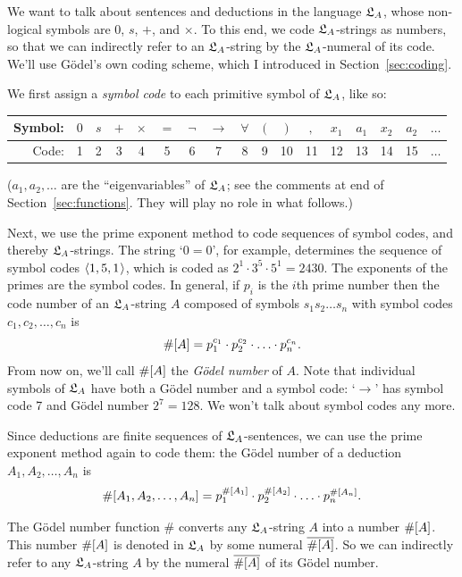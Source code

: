 We want to talk about sentences and deductions in the language $\mathfrak{L}_A$,
whose non-logical symbols are $0$, $s$, $+$, and $\times$.
To this end,
we code $\mathfrak{L}_A$-strings as numbers,
so that we can indirectly refer to an $\mathfrak{L}_A$-string by the $\mathfrak{L}_A$-numeral of its code.
We'll use Gödel's own coding scheme,
which I introduced in Section~\ref{sec:coding}.

We first assign a \emph{symbol code} to each primitive symbol of $\mathfrak{L}_A$,
like so:

\smallskip
\begin{center}
\begin{tabular}{rcccccccccccccccc}
\toprule
Symbol: & $0$ & $s$ & $+$ & $\times$ & $=$ & $\neg$ & $\to$ & $\forall$ & $($ & $)$ & $,$ & $x_{1}$ & $a_{1}$ & $x_2$ & $a_2$ & $\ldots$ \\
\midrule
Code: & 1 & 2 & 3 & 4 & 5 & 6 & 7 & 8 & 9 & 10 & 11 & 12 & 13 & 14 & 15 & $\ldots$ \\
\bottomrule
\end{tabular}
\end{center}
\smallskip

\noindent%
($a_1, a_2, \ldots$ are the ``eigenvariables'' of $\mathfrak{L}_A$;
see the comments at end of Section~\ref{sec:functions}.
They will play no role in what follows.)

Next, we use the prime exponent method to code sequences of symbol codes,
and thereby $\mathfrak{L}_A$-strings.
The string `$0 = 0$',
for example,
determines the sequence of symbol codes $\t{1, 5, 1}$,
which is coded as $2^{1} \cdot 3^{5} \cdot 5^{1} = 2430$.
The exponents of the primes are the symbol codes.
In general,
if $p_i$ is the $i$th prime number then
the code number of an $\mathfrak{L}_A$-string $A$ composed
of symbols $s_1s_2\ldots s_n$ with symbol codes $c_1, c_2, \ldots, c_n$ is
\[
    \#[A] = p_1^{c_1} \cdot p_2^{c_2} \cdot \ldots  \cdot p_n^{c_n}.
\]
From now on,
we'll call $\#[A]$ the \emph{Gödel number} of $A$.
Note that
individual symbols of $\mathfrak{L}_A$ have both a Gödel number and a symbol code:
`$\!\to\!$' has symbol code 7 and Gödel number $2^{7} = 128$.
We won't talk about symbol codes any more.

Since deductions are finite sequences of $\mathfrak{L}_A$-sentences,
we can use the prime exponent method again to code them:
the Gödel number of a deduction $A_1, A_2, \ldots, A_n$ is
\[
  \#[A_1, A_2, \ldots, A_n] = p_1^{\#[A_1]} \cdot p_2^{\#[A_2]} \cdot \ldots \cdot p_n^{\#[A_n]}.
\]

The Gödel number function $\#$ converts
any $\mathfrak{L}_A$-string $A$ into a number $\#[A]$.
This number $\#[A]$ is denoted in $\mathfrak{L}_A$ by some numeral $\overline{\#[A]}$.
So we can indirectly refer to any $\mathfrak{L}_A$-string $A$ by the numeral $\overline{\#[A]}$
of its Gödel number.

